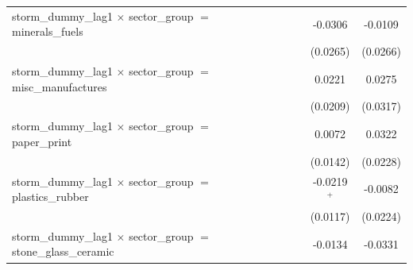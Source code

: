 \begin{tabular}{lcccccccc}
   storm\_dummy\_lag1 $\times$ sector\_group $=$ minerals\_fuels                  &                       &                       &                       &                       &                       &                       & -0.0306               & -0.0109\\   
                                                                                  &                       &                       &                       &                       &                       &                       & (0.0265)              & (0.0266)\\   
   storm\_dummy\_lag1 $\times$ sector\_group $=$ misc\_manufactures               &                       &                       &                       &                       &                       &                       & 0.0221                & 0.0275\\   
                                                                                  &                       &                       &                       &                       &                       &                       & (0.0209)              & (0.0317)\\   
   storm\_dummy\_lag1 $\times$ sector\_group $=$ paper\_print                     &                       &                       &                       &                       &                       &                       & 0.0072                & 0.0322\\   
                                                                                  &                       &                       &                       &                       &                       &                       & (0.0142)              & (0.0228)\\   
   storm\_dummy\_lag1 $\times$ sector\_group $=$ plastics\_rubber                 &                       &                       &                       &                       &                       &                       & -0.0219$^{+}$         & -0.0082\\   
                                                                                  &                       &                       &                       &                       &                       &                       & (0.0117)              & (0.0224)\\   
   storm\_dummy\_lag1 $\times$ sector\_group $=$ stone\_glass\_ceramic            &                       &                       &                       &                       &                       &                       & -0.0134               & -0.0331\\   

\end{tabular}
